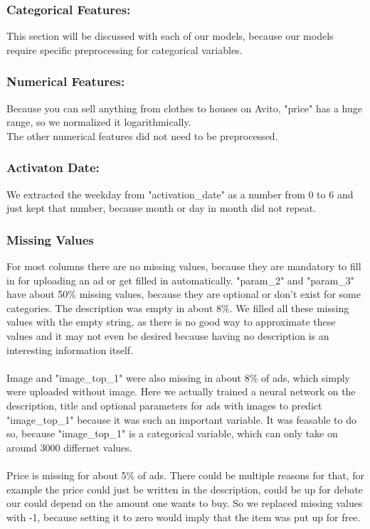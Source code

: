 \documentclass[runningheads]{llncs}
\begin{document}
\subsubsection{Categorical Features:} This section will be discussed with each of our models, because our models require specific preprocessing for categorical variables.
\subsubsection{Numerical Features:}
Because you can sell anything from clothes to houses on Avito, "price" has a huge range, so we normalized it logarithmically.\\
The other numerical features did not need to be preprocessed.
\subsubsection{Activaton Date:} 
We extracted the weekday from "activation\_date" as a number from 0 to 6 and just kept that number, because month or day in month did not repeat.

\subsubsection{Missing Values}
 For most columns there are no missing values, because they are mandatory to fill in for uploading an ad or get filled in automatically. "param\_2" and "param\_3" have about 50\% missing values, because they are optional or don't exist for some categories. The description was empty in about 8\%. We filled all these missing values with the empty string, as there is no good way to approximate these values and it may not even be desired because having no description is an interesting information itself.\\ \\
 Image and "image\_top\_1" were also missing in about 8\% of ads, which simply were uploaded without image. Here we actually trained a neural network on the description, title and optional parameters for ads with images to predict "image\_top\_1" because it was such an important variable. It was feasable to do so, because "image\_top\_1" is a categorical variable, which can only take on around 3000 differnet values.\\ \\
 Price is missing for about 5\%  of ads. There could be multiple reasons for that, for example the price could just be written in the description, could be up for debate our could depend on the amount one wants to buy. So we replaced missing values with -1, because setting it to zero would imply that the item was put up for free.
 
\end{document}
